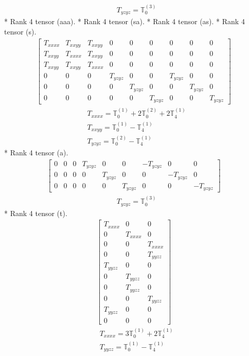\documentclass[fleqn,8pt,landscape]{jsarticle}
\begin{document}
\begin{align*}
& T_{yzyz} = \mathbb{T}_{0}^{(3)}
\end{align*}
* Rank 4 tensor (aaa).
* Rank 4 tensor (sa).
* Rank 4 tensor (as).
* Rank 4 tensor (s).
\begin{align*}
\begin{bmatrix} T_{xxxx} & T_{xxyy} & T_{xxyy} & 0 & 0 & 0 & 0 & 0 & 0 \\ T_{xxyy} & T_{xxxx} & T_{xxyy} & 0 & 0 & 0 & 0 & 0 & 0 \\ T_{xxyy} & T_{xxyy} & T_{xxxx} & 0 & 0 & 0 & 0 & 0 & 0 \\ 0 & 0 & 0 & T_{yzyz} & 0 & 0 & T_{yzyz} & 0 & 0 \\ 0 & 0 & 0 & 0 & T_{yzyz} & 0 & 0 & T_{yzyz} & 0 \\ 0 & 0 & 0 & 0 & 0 & T_{yzyz} & 0 & 0 & T_{yzyz} \end{bmatrix}
\end{align*}
\begin{align*}
& T_{xxxx} = \mathbb{T}_{0}^{(1)} + 2 \mathbb{T}_{0}^{(2)} + 2 \mathbb{T}_{4}^{(1)} \\
& T_{xxyy} = \mathbb{T}_{0}^{(1)} - \mathbb{T}_{4}^{(1)} \\
& T_{yzyz} = \mathbb{T}_{0}^{(2)} - \mathbb{T}_{4}^{(1)}
\end{align*}
* Rank 4 tensor (a).
\begin{align*}
\begin{bmatrix} 0 & 0 & 0 & T_{yzyz} & 0 & 0 & - T_{yzyz} & 0 & 0 \\ 0 & 0 & 0 & 0 & T_{yzyz} & 0 & 0 & - T_{yzyz} & 0 \\ 0 & 0 & 0 & 0 & 0 & T_{yzyz} & 0 & 0 & - T_{yzyz} \end{bmatrix}
\end{align*}
\begin{align*}
& T_{yzyz} = \mathbb{T}_{0}^{(3)}
\end{align*}
* Rank 4 tensor (t).
\begin{align*}
\begin{bmatrix} T_{xxxx} & 0 & 0 \\ 0 & T_{xxxx} & 0 \\ 0 & 0 & T_{xxxx} \\ 0 & 0 & T_{yyzz} \\ T_{yyzz} & 0 & 0 \\ 0 & T_{yyzz} & 0 \\ 0 & T_{yyzz} & 0 \\ 0 & 0 & T_{yyzz} \\ T_{yyzz} & 0 & 0 \\ 0 & 0 & 0 \end{bmatrix}
\end{align*}
\begin{align*}
& T_{xxxx} = 3 \mathbb{T}_{0}^{(1)} + 2 \mathbb{T}_{4}^{(1)} \\
& T_{yyzz} = \mathbb{T}_{0}^{(1)} - \mathbb{T}_{4}^{(1)}
\end{align*}
\end{document}

